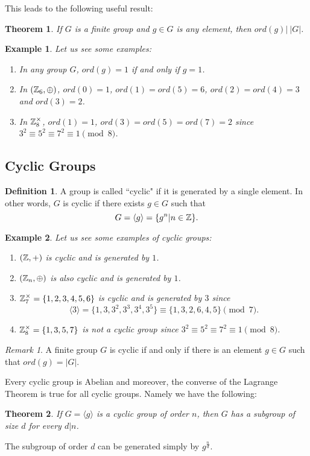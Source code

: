 \documentclass[12pt]{article}
\theoremstyle{plain}
\newtheorem{example}{Example}
\newtheorem{theorem}{Theorem}
\theoremstyle{definition}
\newtheorem{definition}{Definition}
\theoremstyle{remark}
\newtheorem{remark}{Remark}
\begin{document}
This leads to the following useful result:
\begin{theorem}
If $G$ is a finite group and $g \in G$ is any element, then
$ord(g)| \: |G|$.
\end{theorem}
\begin{example}
Let us see some examples:
\begin{enumerate}
    \item In any group $G$, $ord(g)=1$ if and only if $g=1$.
    \item In $(\mathbb{Z}_6,\oplus)$, $ord (0)=1$, $ord(1)=ord(5)=6$, $ord(2)=ord(4)=3$ and $ord(3)=2$.
    \item In $\mathbb{Z}_{8}^{\times}$, $ord(1)=1$, $ord(3)=ord(5)=ord(7)=2$ since $3^2\equiv 5^2\equiv 7^2 \equiv 1 \pmod{8}$.
\end{enumerate}
\end{example}

\subsection{Cyclic Groups}
\begin{definition}
A group is called ``cyclic" if it is generated by a single element. In other words, $G$ is cyclic if there exists $g\in G$ such that
$$G = \langle g\rangle = \{g^n|n\in \mathbb{Z}\}.$$
\end{definition}

\begin{example}
Let us see some examples of cyclic groups:
\begin{enumerate}
    \item $(\mathbb{Z},+)$ is cyclic and is generated by $1$.
    \item $(\mathbb{Z}_n, \oplus)$ is also cyclic and is generated by $1$.
    \item $\mathbb{Z}_7^{\times} = \{1,2,3,4,5,6\}$ is cyclic and is generated by $3$ since
    $$\langle3\rangle = \{1,3,3^2, 3^3, 3^4, 3^5\} \equiv \{1,3,2,6,4,5\} \pmod{7}.$$
    \item $\mathbb{Z}_8^{\times} = \{1,3,5,7\}$ is not a cyclic group since $3^2\equiv 5^2\equiv 7^2\equiv 1 \pmod{8}$.
\end{enumerate}
\end{example}
\begin{remark}
A finite group $G$ is cyclic if and only if there is an element $g\in G$ such that $ord(g)=|G|$.
\end{remark}

Every cyclic group is Abelian and moreover, the converse of the Lagrange Theorem is true for all cyclic groups. Namely we have the following:
\begin{theorem}
If $G=\langle g\rangle$ is a cyclic group of order $n$, then $G$ has a subgroup of size $d$ for every $d|n$.
\end{theorem}
The subgroup of order $d$ can be generated simply by $g^{\frac{n}{d}}$.
\end{document}
